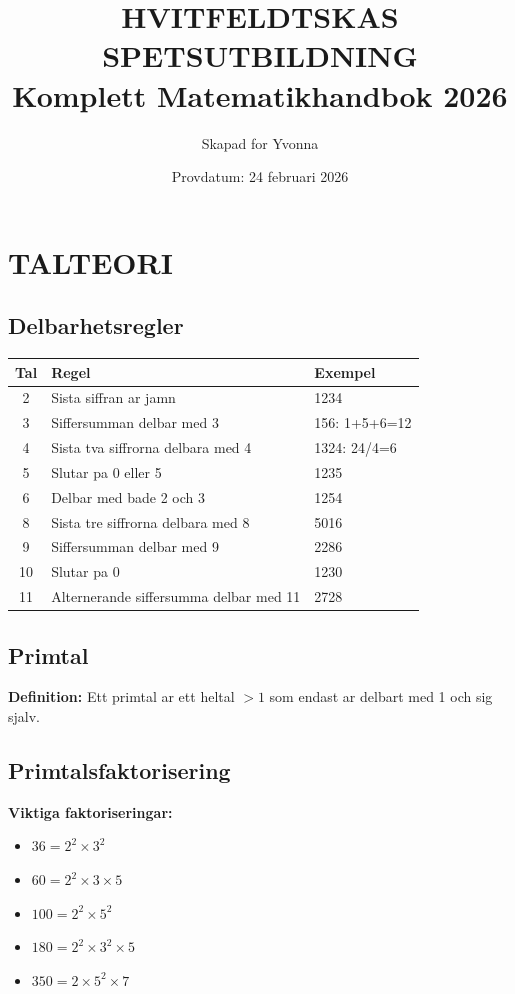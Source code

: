 \documentclass[11pt,a4paper]{article}
\title{\Huge\textbf{HVITFELDTSKAS SPETSUTBILDNING}\\[0.5cm]
\Large Komplett Matematikhandbok 2026}
\author{Skapad for Yvonna}
\date{Provdatum: 24 februari 2026}
\begin{document}
\maketitle
\tableofcontents
\newpage

\section{TALTEORI}

\subsection{Delbarhetsregler}

\begin{tabular}{|c|l|l|}
\hline
\textbf{Tal} & \textbf{Regel} & \textbf{Exempel} \\
\hline
2 & Sista siffran ar jamn & 1234 \\
3 & Siffersumman delbar med 3 & 156: 1+5+6=12 \\
4 & Sista tva siffrorna delbara med 4 & 1324: 24/4=6 \\
5 & Slutar pa 0 eller 5 & 1235 \\
6 & Delbar med bade 2 och 3 & 1254 \\
8 & Sista tre siffrorna delbara med 8 & 5016 \\
9 & Siffersumman delbar med 9 & 2286 \\
10 & Slutar pa 0 & 1230 \\
11 & Alternerande siffersumma delbar med 11 & 2728 \\
\hline
\end{tabular}

\subsection{Primtal}

\textbf{Definition:} Ett primtal ar ett heltal $> 1$ som endast ar delbart med 1 och sig sjalv.


\subsection{Primtalsfaktorisering}

\textbf{Viktiga faktoriseringar:}
\begin{itemize}
\item $36 = 2^2 \times 3^2$
\item $60 = 2^2 \times 3 \times 5$
\item $100 = 2^2 \times 5^2$
\item $180 = 2^2 \times 3^2 \times 5$
\item $350 = 2 \times 5^2 \times 7$
\end{itemize}
\end{document}
